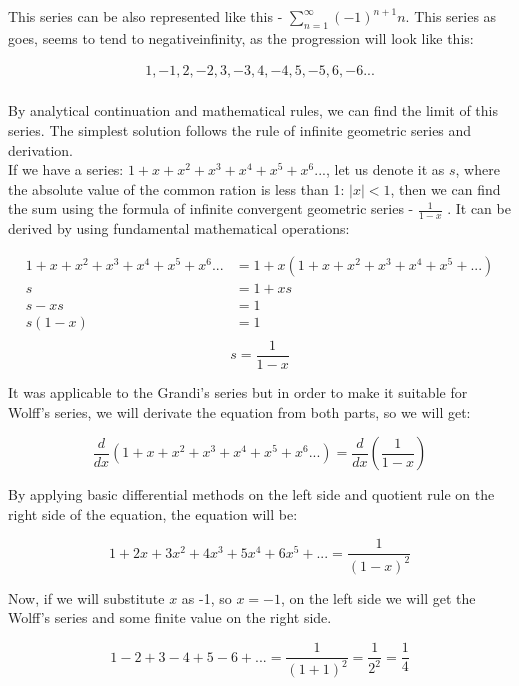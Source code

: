 \documentclass[a4paper]{article}
\begin{document}
This series can be also represented like this - $\sum_{n=1}^\infty (-1)^{n+1}n$. This series as goes, seems to tend to negativeinfinity,
as the progression will look like this:

\begin{align*}
1, -1, 2, -2, 3, -3, 4, -4, 5, -5, 6, -6...\\
\end{align*}

By analytical continuation and mathematical rules, we can find the limit of this series. The simplest
solution follows the rule of infinite geometric series and derivation.\\

If we have a series: $1+x+x^2+x^3+x^4+x^5+x^6...$, let us denote it as $s$, where the absolute value of the common
ration is less than 1: $|x| < 1$, then we can find the sum using the formula of infinite convergent
geometric series - $\frac{1}{1-x}$ . It can be derived by using fundamental mathematical operations:

\begin{align*}
  1+x+x^2+x^3+x^4+x^5+x^6...&=1+x(1+x+x^2+x^3+x^4+x^5+...)\\
  s&=1+xs\\
  s-xs&=1\\
  s(1-x)&=1\\
\end{align*}
\begin{equation}
  s=\frac{1}{1-x}
  \end{equation}

It was applicable to the Grandi's series but in order to make it suitable for Wolff's series, we will
derivate the equation from both parts, so we will get:

\begin{equation*}
  \frac{d}{dx}(1+x+x^2+x^3+x^4+x^5+x^6...)=\frac{d}{dx}(\frac{1}{1-x})
  \end{equation*}

By applying basic differential methods on the left side and quotient rule on the right side of the
equation, the equation will be:

\begin{equation*}
  1+2x+3x^2+4x^3+5x^4+6x^5+...=\frac{1}{(1-x)^2}
  \end{equation*}

Now, if we will substitute $x$ as -1, so $x = − 1$, on the left side we will get the Wolff's series and
some finite value on the right side.

\begin{equation}
  1-2+3-4+5-6+...=\frac{1}{(1+1)^2}=\frac{1}{2^2}=\frac{1}{4}
  \label{Wolff}
\end{equation}
\end{document}
